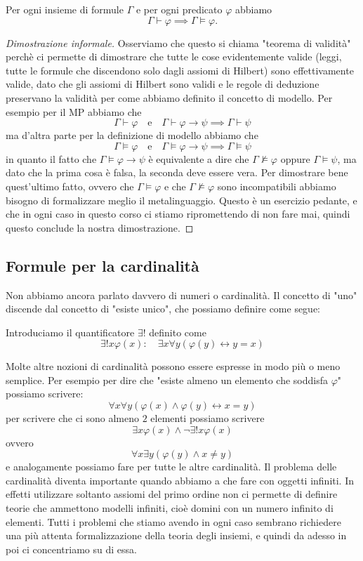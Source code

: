 \documentclass[11pt]{scrartcl}
\begin{document}
	\begin{metateorema}
		Per ogni insieme di formule $\Gamma$ e per ogni predicato $\varphi$ abbiamo
		$$\Gamma\vdash \varphi \implies \Gamma \models \varphi.$$
	\end{metateorema}
	\begin{proof}[Dimostrazione informale]
		Osserviamo che questo si chiama "teorema di validità" perchè ci permette di dimostrare che tutte le cose evidentemente valide (leggi, tutte le formule che discendono solo dagli assiomi di Hilbert) sono effettivamente valide, dato che gli assiomi di Hilbert sono validi e le regole di deduzione preservano la validità per come abbiamo definito il concetto di modello. Per esempio per il MP abbiamo che 
		$$\Gamma\vdash \varphi \quad\text{e}\quad \Gamma \vdash \varphi\to \psi \implies \Gamma \vdash \psi$$
		ma d'altra parte per la definizione di modello abbiamo che 
		$$\Gamma \models \varphi \quad\text{e}\quad \Gamma\models \varphi\to\psi \implies \Gamma \models \psi$$
		in quanto il fatto che $\Gamma\models \varphi\to\psi$ è equivalente a dire che $\Gamma \not\models \varphi$ oppure $\Gamma\models \psi$, ma dato che la prima cosa è falsa, la seconda deve essere vera. Per dimostrare bene quest'ultimo fatto, ovvero che $\Gamma\models \varphi$ e che $\Gamma\not\models\varphi$ sono incompatibili abbiamo bisogno di formalizzare meglio il metalinguaggio. Questo è un esercizio pedante, e che in ogni caso in questo corso ci stiamo ripromettendo di non fare mai, quindi questo conclude la nostra dimostrazione.
 	\end{proof}
 	
 	\subsection{Formule per la cardinalità}
 	
 	Non abbiamo ancora parlato davvero di numeri o cardinalità. Il concetto di "uno" discende dal concetto di "esiste unico", che possiamo definire come segue:
 	\begin{definition}
 		Introduciamo il quantificatore $\exists ! $ definito come
 		$$\exists !x \varphi(x):\quad \exists x\forall y\left(\varphi(y)\leftrightarrow y=x\right) $$
 	\end{definition}
 	Molte altre nozioni di cardinalità possono essere espresse in modo più o meno semplice. Per esempio per dire che "esiste almeno un elemento che soddisfa $\varphi$" possiamo scrivere:
 	$$\forall x \forall y \left(\varphi(x)\land \varphi(y)\leftrightarrow x=y\right)$$
 	per scrivere che ci sono almeno $2$ elementi possiamo scrivere
 	$$\exists x\varphi(x) \land \lnot \exists ! x\varphi(x)$$
 	ovvero
 	$$\forall x \exists y \left(\varphi(y)\land x\ne y\right)$$
 	e analogamente possiamo fare per tutte le altre cardinalità. Il problema delle cardinalità diventa importante quando abbiamo a che fare con oggetti infiniti. In effetti utilizzare soltanto assiomi del primo ordine non ci permette di definire teorie che ammettono modelli infiniti, cioè domini con un numero infinito di elementi. Tutti i problemi che stiamo avendo in ogni caso sembrano richiedere una più attenta formalizzazione della teoria degli insiemi, e quindi da adesso in poi ci concentriamo su di essa.
	
\end{document}
